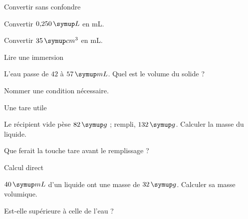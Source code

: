 \par\noindent\begin{minipage}{\linewidth}
\begin{exercice}[1]{Convertir sans confondre}
\begin{questions}
\item Convertir $0{,}250\unite L$ en mL.
\item Convertir $35\unite{cm^3}$ en mL.
\end{questions}
\end{exercice}
\end{minipage}
\par\noindent\begin{minipage}{\linewidth}
\begin{exercice}[1]{Lire une immersion}
\begin{questions}
\item L’eau passe de $42$ à $57\unite{mL}$. Quel est le volume du solide ?
\item Nommer une condition nécessaire.
\end{questions}
\end{exercice}
\end{minipage}
\par\noindent\begin{minipage}{\linewidth}
\begin{exercice}[1]{Une tare utile}
\begin{questions}
\item Le récipient vide pèse $82\unite g$ ; rempli, $132\unite g$. Calculer la masse du liquide.
\item Que ferait la touche tare avant le remplissage ?
\end{questions}
\end{exercice}
\end{minipage}
\par\noindent\begin{minipage}{\linewidth}
\begin{exercice}[1]{Calcul direct}
\begin{questions}
\item $40\unite{mL}$ d’un liquide ont une masse de $32\unite g$. Calculer sa masse volumique.
\item Est-elle supérieure à celle de l’eau ?
\end{questions}
\end{exercice}
\end{minipage}
